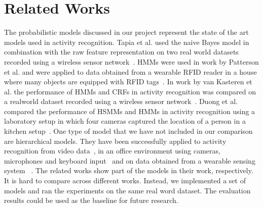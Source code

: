 \section{Related Works}

The probabilistic models discussed in our project represent the state of the art models used in activity recognition. Tapia et al. used the naive Bayes model in combination with the raw feature representation on two real world datasets recorded using a wireless sensor network~\cite{emtapia}. HMMs were used in work by Patterson et al. and were applied to data obtained from a wearable RFID reader in a house where many objects are equipped with RFID tags~\cite{djpatt}. In work by van Kasteren et al. the performance of HMMs and CRFs in activity recognition was compared on a realworld dataset recorded using a wireless sensor network~\cite{tvkasteren}. Duong et al. compared the performance of HSMMs and HMMs in activity recognition using a laboratory setup in which four cameras captured the location of a person in a kitchen setup~\cite{tduong}. One type of model that we have not included in our comparison are hierarchical models. They have been successfully applied to activity recognition from video data~\cite{sluhr}, in an office environment using cameras, microphones and keyboard input~\cite{noliver} and on data obtained from a wearable sensing system ~\cite{asubr}.
The related works show part of the models in their work, respectively. It is hard to compare across different works. Instead, we implemented a set of models and ran the experiments on the same real word dataset. The evaluation results could be used as the baseline for future research. 




